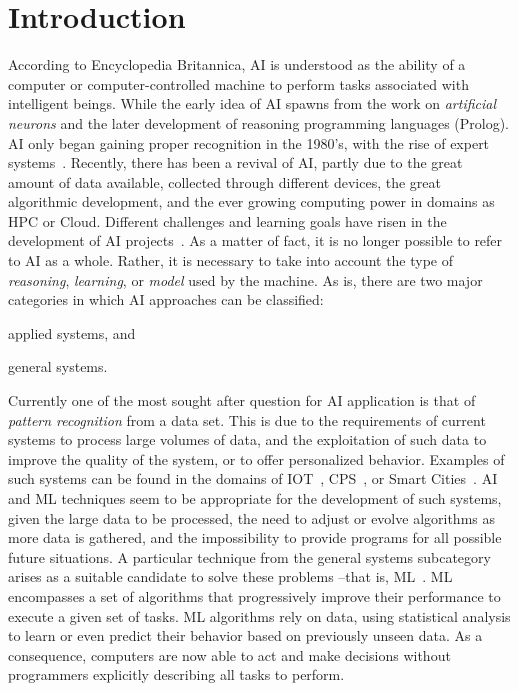 
\section{Introduction}
\label{sec:introduction}

According to Encyclopedia Britannica, \ac{AI} is understood as the ability of a computer or 
computer-controlled machine to perform tasks associated with intelligent beings. While the early 
idea of \ac{AI} spawns from the work on \textit{artificial neurons} and the later development of
reasoning programming languages (\eg Prolog). \ac{AI} only began gaining proper recognition 
in the 1980's, with the rise of expert systems~\cite{russel09}.  Recently, there has been a revival of 
\ac{AI}, partly due to the great amount of data available, collected through different devices, the 
great algorithmic development, and the ever growing computing power in domains as \ac{HPC} or 
Cloud. Different challenges and learning goals have risen in the development of \ac{AI} 
projects~\cite{russel09}. As a matter of fact, it is no longer possible to refer to \ac{AI} as a whole. 
Rather, it is necessary to take into account the type of \emph{reasoning}, \emph{learning}, or 
\emph{model} used by the machine. As is, there are two major categories in which \ac{AI} 
approaches can be classified:
\begin{enumerate*}[label=(\arabic*)]
\item applied systems, and
\item general systems.
\end{enumerate*}

Currently one of the most sought after question for \ac{AI} application is that of \emph{pattern 
recognition} from a data set. This is due to the requirements of current systems to process large 
volumes of data, and the exploitation of such data to improve the quality of the system, or to offer 
personalized behavior. Examples of such systems can be found in the domains of 
\ac{IOT}~\cite{mattern10}, \ac{CPS}~\cite{holzl15}, or Smart Cities~\cite{zanella14}. \ac{AI} and 
\ac{ML} techniques seem to be appropriate for the development of such systems, given the large 
data to be processed, the need to adjust or evolve algorithms as more data is gathered, and the 
impossibility to provide programs for all possible future situations. 
A particular technique from the general systems subcategory arises 
as a suitable candidate to solve these problems --that is, \ac{ML}~\cite{mitchell97}. 
\ac{ML} encompasses a set of algorithms that progressively improve their performance to execute 
a given set of tasks. \ac{ML} algorithms rely on data, using statistical analysis to learn or even predict 
their behavior based on previously unseen data. As a consequence, computers are now able to act 
and make decisions without programmers explicitly describing all tasks to perform.

